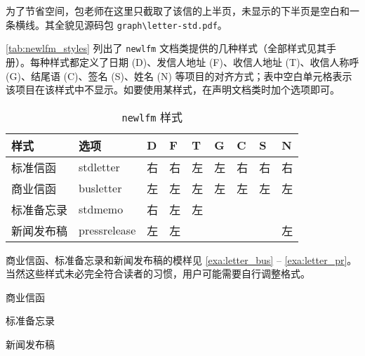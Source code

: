 为了节省空间，包老师在这里只截取了该信的上半页，未显示的下半页是空白和一条横线。其全貌见源码包 \verb|graph\letter-std.pdf|。

\autoref{tab:newlfm_styles} 列出了 \texttt{newlfm} 文档类提供的几种样式（全部样式见其手册）。每种样式都定义了日期 (D)、发信人地址 (F)、收信人地址 (T)、收信人称呼 (G)、结尾语 (C)、签名 (S)、姓名 (N) 等项目的对齐方式；表中空白单元格表示该项目在该样式中不显示。如要使用某样式，在声明文档类时加个选项即可。

\begin{table}[htbp]
\centering
\caption{\texttt{newlfm} 样式}
\label{tab:newlfm_styles}
\begin{tabular}{lllllllll}
    \toprule
    样式 & 选项 & D & F & T & G & C & S & N\\
    \midrule
    标准信函 & stdletter & 右 & 右 & 左 & 左 & 右 & 右 & 右\\
    商业信函 & busletter & 左 & 左 & 左 & 左 & 左 & 左 & 左\\
    标准备忘录 & stdmemo & 右 & 左 & 左 & & & & \\
    新闻发布稿 & pressrelease & 左 & 左 & & & & & 左\\
    \bottomrule
\end{tabular}
\end{table}

商业信函、标准备忘录和新闻发布稿的模样见 \autoref{exa:letter_bus} -- \autoref{exa:letter_pr}。当然这些样式未必完全符合读者的习惯，用户可能需要自行调整格式。

\begin{example}[h]
\begin{Demo}
\centering
{}
\end{Demo}
\caption{商业信函}
\label{exa:letter_bus}
\end{example}

\begin{example}[h]
\begin{Demo}
\centering
{}
\end{Demo}
\caption{标准备忘录}
\label{exa:letter_memo}
\end{example}

\begin{example}[!h]
\begin{Demo}
\centering
{}
\end{Demo}
\caption{新闻发布稿}
\label{exa:letter_pr}
\end{example}

